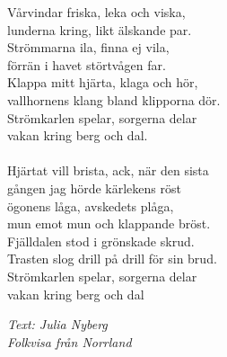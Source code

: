 \vspace{10pt}
Vårvindar friska, leka och viska,\\
lunderna kring, likt älskande par.\\
Strömmarna ila, finna ej vila,\\
förrän i havet störtvågen far.\\
Klappa mitt hjärta, klaga och hör,\\
vallhornens klang bland klipporna dör.\\
Strömkarlen spelar, sorgerna delar\\
vakan kring berg och dal.\\
\\
Hjärtat vill brista, ack, när den sista \\
gången jag hörde kärlekens röst\\
ögonens låga, avskedets plåga,\\
mun emot mun och klappande bröst.\\
Fjälldalen stod i grönskade skrud.\\
Trasten slog drill på drill för sin brud.\\
Strömkarlen spelar, sorgerna delar\\
vakan kring berg och dal
\par
\vspace{10pt}
{\footnotesize\textit{Text: Julia Nyberg\\ Folkvisa från Norrland}}
